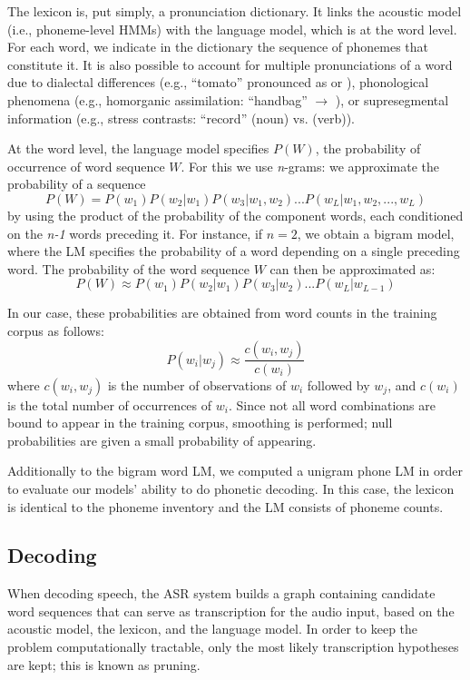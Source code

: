 The lexicon is, put simply, a pronunciation dictionary. It links the acoustic model (i.e., phoneme-level HMMs) with the language model, which is at the word level. For each word, we indicate in the dictionary the sequence of phonemes that constitute it. It is also possible to account for multiple pronunciations of a word due to dialectal differences (e.g., ``tomato'' pronounced as  or ), phonological phenomena (e.g., homorganic assimilation: ``handbag''  $\rightarrow$ ), or supresegmental information (e.g., stress contrasts: ``record''  (noun) vs.  (verb)).

At the word level, the language model specifies $P(W)$, the probability of occurrence of word sequence $W$. For this we use \textit{n}-grams: we approximate the probability of a sequence
\begin{equation}
P(W) = P(w_{1})P(w_2|w_1)P(w_3 | w_1, w_2)...P(w_L | w_1, w_2, ..., w_L)
\end{equation}
by using the product of the probability of the component words, each conditioned on the \textit{n-1} words preceding it. For instance, if $n = 2$, we obtain a bigram model, where the LM specifies the probability of a word depending on a single preceding word. The probability of the word sequence $W$ can then be approximated as:    
\begin{equation}
P(W) \approx P(w_{1})P(w_2|w_1)P(w_3 | w_2)...P(w_L | w_{L-1})
\end{equation}

In our case, these probabilities are obtained from word counts in the training corpus as follows:
\begin{equation}
P(w_i | w_j) \approx \frac{c(w_i, w_j)}{c(w_i)}
\end{equation}
where $c(w_i, w_j)$ is the number of observations of $w_i$ followed by $w_j$, and $c(w_i)$ is the total number of occurrences of $w_i$.
Since not all word combinations are bound to appear in the training corpus, smoothing is performed; null probabilities are given a small probability of appearing. 

Additionally to the bigram word LM, we computed a unigram phone LM in order to evaluate our models' ability to do phonetic decoding. In this case, the lexicon is identical to the phoneme inventory and the LM consists of phoneme counts.  

\subsection{Decoding}
When decoding speech, the ASR system builds a graph containing candidate word sequences that can serve as transcription for the audio input, based on the acoustic model, the lexicon, and the language model. In order to keep the problem computationally tractable, only the most likely transcription hypotheses are kept; this is known as pruning.

